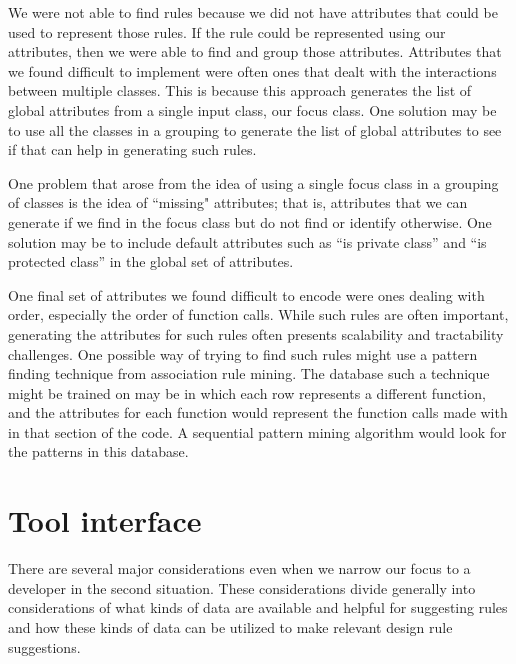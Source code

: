 \documentclass[12pt]{article}
\begin{document}
We were not able to find rules because we did not have attributes that could be used to represent those rules. If the rule could be represented using our attributes, then we were able to find and group those attributes. Attributes that we found difficult to implement were often ones that dealt with the interactions between multiple classes. This is because this approach generates the list of global attributes from a single input class, our focus class. One solution may be to use all the classes in a grouping to generate the list of global attributes to see if that can help in generating such rules. 

One problem that arose from the idea of using a single focus class in a grouping of classes is the idea of  ``missing" attributes; that is, attributes that we can generate if we find in the focus class but do not find or identify otherwise. One solution may be to include default attributes such as “is private class” and “is protected class” in the global set of attributes.

One final set of attributes we found difficult to encode were ones dealing with order, especially the order of function calls. While such rules are often important, generating the attributes for such rules often presents scalability and tractability challenges. One possible way of trying to find such rules might use a pattern finding technique from association rule mining. The database such a technique might be trained on may be in which each row represents a different function, and the attributes for each function would represent the function calls made with in that section of the code. A sequential pattern mining algorithm would look for the patterns in this database.



\section{Tool interface} \label{toolInterface}
There are several major considerations even when we narrow our focus to a developer in the second situation. These considerations divide generally into considerations of what kinds of data are available and helpful for suggesting rules and how these kinds of data can be utilized to make relevant design rule suggestions.
\end{document}
